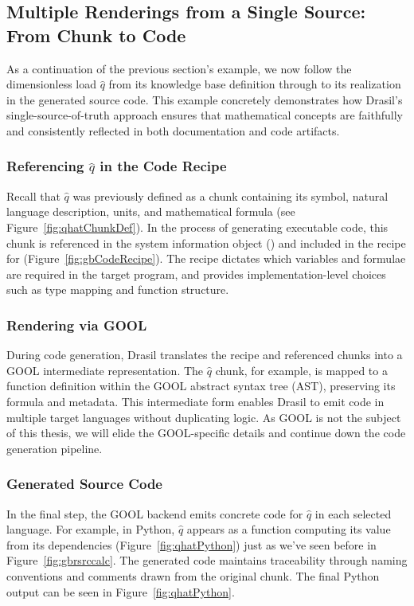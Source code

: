 \subsection{Multiple Renderings from a Single Source: From Chunk to Code}

As a continuation of the previous section's example, we now follow the
dimensionless load $\hat{q}$ from its knowledge base definition through to its 
realization in the generated source code. This example concretely demonstrates 
how Drasil's single-source-of-truth approach ensures that mathematical concepts
are faithfully and consistently reflected in both documentation and code 
artifacts.

\subsubsection{Referencing $\hat{q}$ in the Code Recipe}

Recall that $\hat{q}$ was previously defined as a chunk containing its symbol, 
natural language description, units, and mathematical formula (see 
Figure~\ref{fig:qhatChunkDef}). In the process of generating executable code, 
this chunk is referenced in the system information object () and 
included in the  recipe for 
\gb{} (Figure~\ref{fig:gbCodeRecipe}). The recipe dictates which variables and
formulae are required in the target program, and provides implementation-level 
choices such as type mapping and function structure.


\subsubsection{Rendering via GOOL}

During code generation, Drasil translates the recipe and referenced chunks into
a GOOL intermediate representation. The $\hat{q}$ chunk, for example, is mapped
to a function definition within the GOOL abstract syntax tree (AST), preserving
its formula and metadata. This intermediate form enables
Drasil to emit code in multiple target languages without duplicating logic. As 
GOOL is not the subject of this thesis, we will elide the GOOL-specific details 
and continue down the code generation pipeline.

\subsubsection{Generated Source Code}

In the final step, the GOOL backend emits concrete code for $\hat{q}$ in each 
selected language. For example, in Python, $\hat{q}$ appears as a function 
computing its value from its dependencies (Figure~\ref{fig:qhatPython}) just as
we've seen before in Figure~\ref{fig:gbrsrccalc}. The generated code maintains 
traceability through naming conventions and comments drawn from the original 
chunk. The final Python output can be seen in Figure~\ref{fig:qhatPython}.

